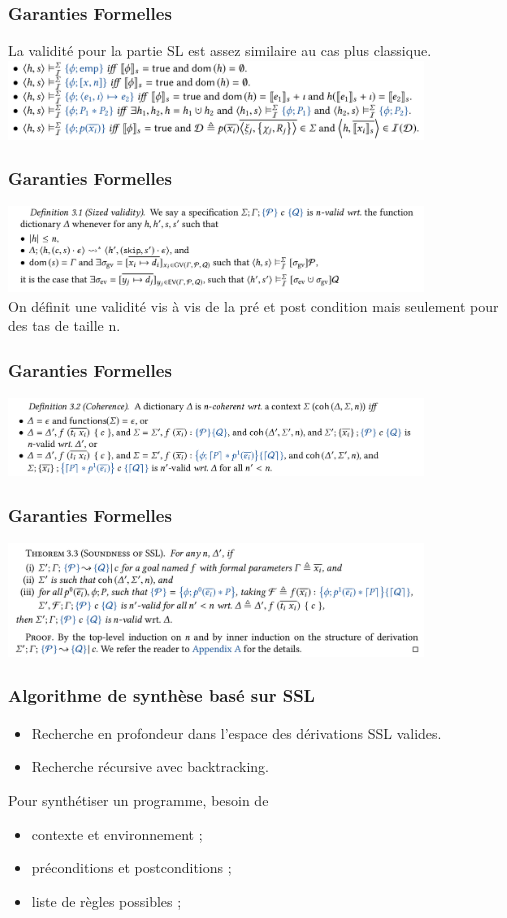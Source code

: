 \documentclass[french]{beamer}
\begin{document}
\begin{frame}[fragile]
	\frametitle{Garanties Formelles}
	La validité pour la partie SL est assez similaire au cas plus classique.\\
	\vspace{0.5cm}
	\includegraphics[width=11cm]{figures/satisfaction.png}
\end{frame}
\begin{frame}[fragile]
	\frametitle{Garanties Formelles}
	\includegraphics[width=11cm]{figures/nvalid.png}\\
	
	On définit une validité vis à vis de la pré et post condition mais seulement pour des tas de taille n.
\end{frame}
\begin{frame}[fragile]
	\frametitle{Garanties Formelles}
	\includegraphics[width=11cm]{figures/coherence.png}
\end{frame}
\begin{frame}[fragile]
	\frametitle{Garanties Formelles}
	\includegraphics[width=11cm]{figures/thm.png}
\end{frame}
\begin{frame}[fragile]
	\frametitle{Algorithme de synthèse basé sur SSL}
   \begin{itemize}
      \item Recherche en profondeur dans l'espace des dérivations SSL valides.
      \item Recherche récursive avec backtracking.
   \end{itemize}
   Pour synthétiser un programme, besoin de
   \begin{itemize}
       \item contexte et environnement ;
       \item préconditions et postconditions ;
       \item liste de règles possibles ;
   \end{itemize}
\end{frame}
\end{document}
